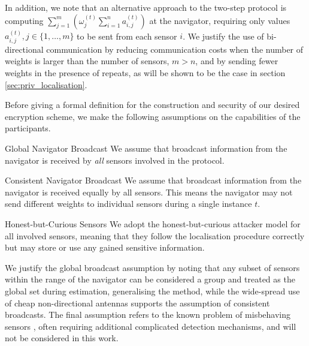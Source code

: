 \documentclass[10pt,letterpaper,oneside,twocolumn,journal]{IEEEtran}
\theoremstyle{definition}
\theoremstyle{definition}
\theoremstyle{remark}
\begin{document}
In addition, we note that an alternative approach to the two-step protocol is computing $\sum^{m}_{j=1}(\omega_j^{(t)}\sum^{n}_{i=1} a_{i,j}^{(t)})$ at the navigator, requiring only values $a_{i,j}^{(t)}, j\in\{1,\dots,m\}$ to be sent from each sensor $i$. We justify the use of bi-directional communication by reducing communication costs when the number of weights is larger than the number of sensors, $m>n$, and by sending fewer weights in the presence of repeats, as will be shown to be the case in section \ref{sec:priv_localisation}.

Before giving a formal definition for the construction and security of our desired encryption scheme, we make the following assumptions on the capabilities of the participants.
\begin{LaTeXdescription}
    \item[Global Navigator Broadcast] We assume that broadcast information from the navigator is received by \textit{all} sensors involved in the protocol.
    \item[Consistent Navigator Broadcast] We assume that broadcast information from the navigator is received equally by all sensors. This means the navigator may not send different weights to individual sensors during a single instance $t$.
    \item[Honest-but-Curious Sensors] We adopt the honest-but-curious attacker model for all involved sensors, meaning that they follow the localisation procedure correctly but may store or use any gained sensitive information.
\end{LaTeXdescription}
We justify the global broadcast assumption by noting that any subset of sensors within the range of the navigator can be considered a group and treated as the global set during estimation, generalising the method, while the wide-spread use of cheap non-directional antennas supports the assumption of consistent broadcasts. The final assumption refers to the known problem of misbehaving sensors \cite{lazosSeRLocSecureRangeindependent2004,ben-galOutlierDetection2005}, often requiring additional complicated detection mechanisms, and will not be considered in this work.
\end{document}

